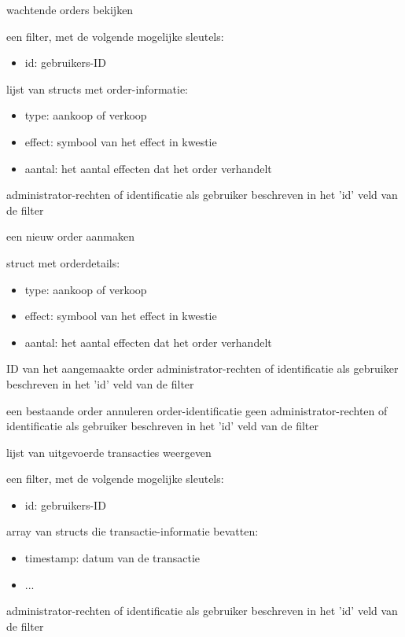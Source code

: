 	{ wachtende orders bekijken }
	{ een filter, met de volgende mogelijke sleutels:
		\begin{itemize}
		\item{id: gebruikers-ID}
		\end{itemize} }
	{ lijst van structs met order-informatie:
		\begin{itemize}
		\item{type: aankoop of verkoop}
		\item{effect: symbool van het effect in kwestie}
		\item{aantal: het aantal effecten dat het order verhandelt}
		\end{itemize} }
	{ administrator-rechten of identificatie als gebruiker beschreven in het 'id' veld van de filter }

	{ een nieuw order aanmaken }
	{ struct met orderdetails:
		\begin{itemize}
		\item{type: aankoop of verkoop}
		\item{effect: symbool van het effect in kwestie}
		\item{aantal: het aantal effecten dat het order verhandelt}
		\end{itemize} }
	{ ID van het aangemaakte order }
	{ administrator-rechten of identificatie als gebruiker beschreven in het 'id' veld van de filter }

	{ een bestaande order annuleren }
	{ order-identificatie }
	{ geen }
	{ administrator-rechten of identificatie als gebruiker beschreven in het 'id' veld van de filter }

	{ lijst van uitgevoerde transacties weergeven }
	{ een filter, met de volgende mogelijke sleutels:
		\begin{itemize}
		\item{id: gebruikers-ID}
		\end{itemize} }
	{ array van structs die transactie-informatie bevatten:
		\begin{itemize}
		\item{timestamp: datum van de transactie}
		\item{...}
		\end{itemize} }
	{ administrator-rechten of identificatie als gebruiker beschreven in het 'id' veld van de filter }

